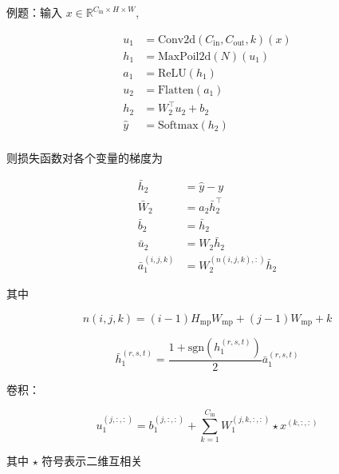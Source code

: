 \documentclass[openany,a4paper,12pt]{ctexbook}
\theoremstyle{kaiti}
\theoremstyle{normal}
\begin{document}
例题：输入 $x\in \mathbb{R} ^{C_{\mathrm{in}}\times H\times W}$, 

\begin{equation}
\begin{aligned}
  u_1&=\mathrm{Conv}2\mathrm{d}\left(C_{\mathrm{in}},C_{\mathrm{out}},k \right)(x)\\
  h_1&=\mathrm{MaxPoil}2\mathrm{d}\left(N \right)\left(u_1 \right) \\
  a_1&=\mathrm{ReLU}\left(h_1 \right) \\
  u_2&=\mathrm{Flatten}\left(a_1 \right)\\
  h_2&=W_{2}^{\top}u_2+b_2 \\
  \hat{y}&=\mathrm{Softmax} \left(h_2 \right)\\
\end{aligned}
\end{equation}

则损失函数对各个变量的梯度为

\begin{equation}
\begin{aligned}
  \bar{h}_2&=\hat{y}-y \\
  \bar{W}_2&=a_2\bar{h}_{2}^{\top}\\
  \bar{b}_2&=\bar{h}_2 \\
  \bar{u}_2&=W_2\bar{h}_2 \\
  \bar{a}_{1}^{\left(i,j,k \right)}&=W_{2}^{\left(n\left(i,j,k \right),: \right)}\bar{h}_2
\end{aligned}
\end{equation}

其中 

\begin{equation}
n\left(i,j,k \right)=\left(i-1 \right)H_{\mathrm{mp}}W_{\mathrm{mp}}+\left(j-1 \right)W_{\mathrm{mp}}+k
\end{equation}

\begin{equation}
\bar{h}_{1}^{(r,s,t)}=\frac{1+\mathrm{sgn} \left(h_{1}^{(r,s,t)} \right)}{2} \bar{a}_{1}^{(r,s,t)}
\end{equation}

卷积：

\begin{equation}
u_{1}^{\left(j,:,: \right)}=b_{1}^{\left(j,:,: \right)}+\sum_{k=1}^{C_{\mathrm{in}}}W_{1}^{\left(j,k,:,: \right)}\star x^{\left(k,:,: \right)}
\end{equation}

其中 $\star$ 符号表示二维互相关
\end{document}
